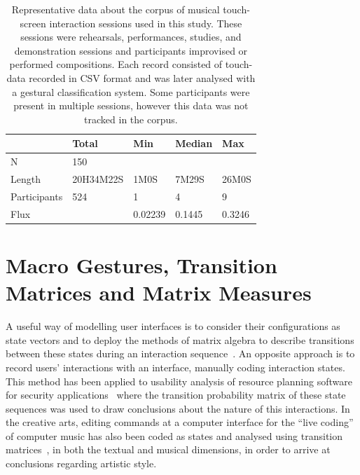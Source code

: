 \documentclass{sigchi}
\begin{document}
\begin{table}
\centering
\begin{tabular}{l|llll}
\hline
            & Total & Min  & Median   & Max     \\ 
\hline
N           & 150       &         &        &  \\
Length      & 20H34M22S & 1M0S    & 7M29S  & 26M0S\\
Participants& 524       & 1       & 4      & 9    \\
Flux        &           & 0.02239 & 0.1445 & 0.3246\\
\hline
\end{tabular}
\caption{
  Representative data about the corpus of musical touch-screen
  interaction sessions used in this study. These sessions were
  rehearsals, performances, studies, and demonstration sessions and 
  participants improvised or performed compositions. Each record
  consisted of touch-data recorded in CSV format and was later analysed
  with a gestural classification system. Some participants were
  present in multiple sessions, however this data was not tracked in
  the corpus.\label{corpus-table}}
\end{table}


\section{Macro Gestures, Transition Matrices and Matrix Measures}

A useful way of modelling user interfaces is to consider their
configurations as state vectors and to deploy the methods of matrix
algebra to describe transitions between these states during an
interaction sequence~\cite{Thimbleby:2001kq, Thimbleby:2004fj}.
An opposite approach is to record users' interactions with an
interface, manually coding interaction states. 
This method has been applied to usability analysis of resource
planning software for security applications~\cite{Kannampallil:2007fp}
where the transition probability matrix of these state sequences
was used to draw conclusions about the nature of this interactions.
In the creative arts, editing commands at a computer interface for the
``live coding'' of computer music has also been coded as states and
analysed using transition matrices~\cite{Swift:2014tya}, in both the
textual and musical dimensions, in order to arrive at conclusions
regarding artistic style.
\end{document}
